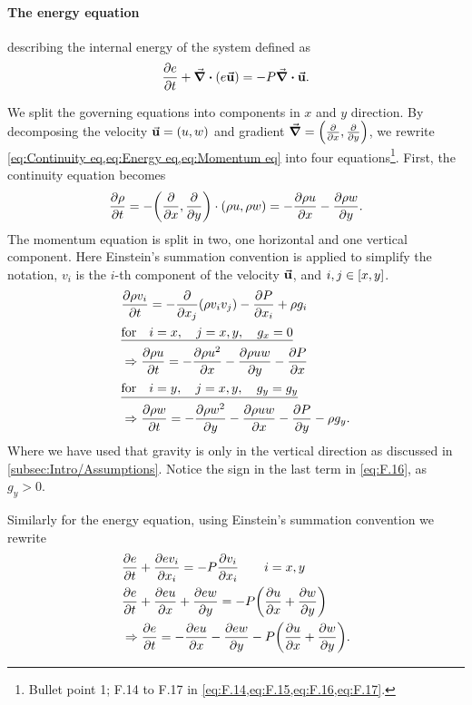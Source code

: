 \documentclass[11pt,a4paper,twocolumn,titlepage]{article}
\begin{document}
\paragraph{The energy equation} describing the internal energy of the system defined as
\begin{equation}
\pdv{e}{t} + \div(e\va{u}) = -P\div{\va{u}}.
\label{eq:Energy eq}
\end{equation}

We split the governing equations into components in $x$ and $y$ direction. By decomposing the velocity $\va{u} = (u,w)$ and gradient $\grad = \qty(\pdv{x},\pdv{y})$, we rewrite \cref{eq:Continuity eq,eq:Energy eq,eq:Momentum eq} into four equations\footnote{Bullet point 1; F.14 to F.17 in \cref{eq:F.14,eq:F.15,eq:F.16,eq:F.17}.}. First, the continuity equation becomes
\begin{align}
\pdv{\rho}{t} = -\qty(\pdv{x},\pdv{y})\cdot\qty(\rho u, \rho w) = -\pdv{\rho u}{x} - \pdv{\rho w}{y} \label{eq:F.14}.
\end{align}
The momentum equation is split in two, one horizontal and one vertical component. Here Einstein's summation convention is applied to simplify the notation, $v_i$ is the $i$-th component of the velocity $\va{u}$, and $i, j \in \qty[x,y]$.
\begin{align}
&\pdv{\rho v_i}{t} = - \pdv{x_j}\qty(\rho v_i v_j) - \pdv{P}{x_i} + \rho g_i \notag
\\
&\underline{ \qq*{for}i = x \qc j = x,y \qc g_x = 0} \notag
\\
&\Rightarrow \pdv{\rho u}{t} = - \pdv{\rho u^2}{x} - \pdv{\rho u w}{y} - \pdv{P}{x} \label{eq:F.15}
\\
&\underline{ \qq*{for}i = y \qc j = x,y \qc g_y = g_y} \notag
\\
&\Rightarrow \pdv{\rho w}{t} = - \pdv{\rho w^2}{y} - \pdv{\rho u w}{x} - \pdv{P}{y} - \rho g_y. \label{eq:F.16}
\end{align}
Where we have used that gravity is only in the vertical direction as discussed in \cref{subsec:Intro/Assumptions}. Notice the sign in the last term in \cref{eq:F.16}, as $g_y>0$.

Similarly for the energy equation, using Einstein's summation convention we rewrite 
\begin{align}
&\pdv{e}{t} + \pdv{ev_i}{x_i} = - P\pdv{v_i}{x_i} \qquad i = x,y \notag
\\
&\pdv{e}{t} + \pdv{e u}{x} + \pdv{e w}{y} = -P\qty(\pdv{u}{x} + \pdv{w}{y}) \notag
\\
&\Rightarrow \pdv{e}{t} = -\pdv{eu}{x} - \pdv{ew}{y} - P\qty(\pdv{u}{x} + \pdv{w}{y}) \label{eq:F.17}.
\end{align}
\end{document}
